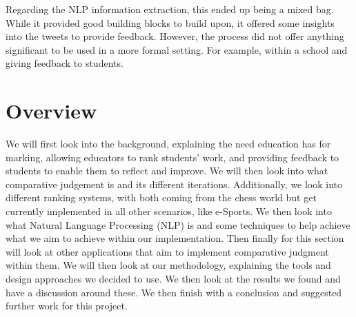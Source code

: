 		Regarding the NLP information extraction, this ended up being a mixed bag. While it provided good building blocks to build upon, it offered some insights into the tweets to provide feedback. However, the process did not offer anything significant to be used in a more formal setting. For example, within a school and giving feedback to students.
	
	\section{Overview}  
	\label{sec:intro_overview} 
	 We will first look into the background, explaining the need education has for marking, allowing educators to rank students' work, and providing feedback to students to enable them to reflect and improve. We will then look into what comparative judgement is and its different iterations. Additionally, we look into different ranking systems, with both coming from the chess world but get currently implemented in all other scenarios, like e-Sports. We then look into what Natural Language Processing (NLP) is and some techniques to help achieve what we aim to achieve within our implementation. Then finally for this section will look at other applications that aim to implement comparative judgment within them. We will then look at our methodology, explaining the tools and design approaches we decided to use. We then look at the results we found and have a discussion around these. We then finish with a conclusion and suggested further work for this project.